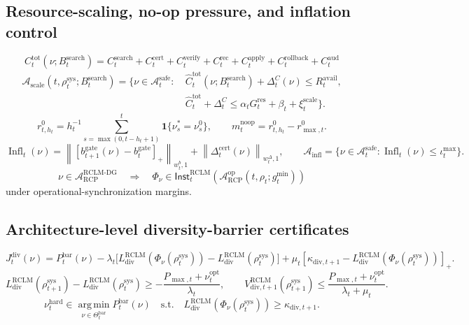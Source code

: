 \documentclass[11pt,a4paper]{article}
\newcommand{\Acal}{\mathcal A}
\newcommand{\argmin}{\operatorname*{arg\,min}}
\newcommand{\RCP}{\mathrm{RCP}}
\newcommand{\RCLM}{\mathrm{RCLM}}
\newcommand{\DG}{\mathrm{DG}}
\newcommand{\sys}{\mathrm{sys}}
\newcommand{\rec}{\mathrm{rec}}
\newcommand{\safe}{\mathrm{safe}}
\newcommand{\aud}{\mathrm{aud}}
\newcommand{\verify}{\mathrm{verify}}
\newcommand{\search}{\mathrm{search}}
\newcommand{\cert}{\mathrm{cert}}
\newcommand{\apply}{\mathrm{apply}}
\newcommand{\hard}{\mathrm{hard}}
\newcommand{\scale}{\mathrm{scale}}
\newcommand{\noop}{\mathrm{noop}}
\newcommand{\infl}{\mathrm{infl}}
\newcommand{\gate}{\mathrm{gate}}
\newcommand{\tot}{\mathrm{tot}}
\newcommand{\avail}{\mathrm{avail}}
\newcommand{\res}{\mathrm{res}}
\newcommand{\rollback}{\mathrm{rollback}}
\begin{document}
\subsection*{Resource-scaling, no-op pressure, and inflation control}
\[
C_t^{\tot}(\nu;B_t^{\search})
=C_t^{\search}+C_t^{\cert}+C_t^{\verify}+C_t^{\rec}+C_t^{\apply}+C_t^{\rollback}+C_t^{\aud}
\]
\[
\begin{aligned}
\Acal_{\scale}(t,\rho_t^{\sys};B_t^{\search})
=\{\nu\in\Acal_t^{\safe}:&
\ \widehat C_t^{\tot}(\nu;B_t^{\search})+\Delta_t^C(\nu)\le R_t^{\avail},\\
&
\ \widehat C_t^{\tot}+\Delta_t^C
\le\alpha_tG_t^{\res}+\beta_t+\xi_t^{\scale}\}.
\end{aligned}
\]
\[
r_{t,h_t}^{0}=h_t^{-1}\sum_{s=\max(0,t-h_t+1)}^t\mathbf 1\{\nu_s^*=\nu_s^0\},
\qquad
m_t^{\noop}=r_{t,h_t}^{0}-r_{\max,t}^{0}.
\]
\[
\operatorname{Infl}_t(\nu)=
\left\|[b_{t+1}^{\gate}(\nu)-b_t^{\gate}]_+\right\|_{w_t^b,1}
+
\left\|\Delta_t^{\cert}(\nu)\right\|_{w_t^\Delta,1},
\qquad
\Acal_{\infl}=\{\nu\in\Acal_t^{\safe}:\operatorname{Infl}_t(\nu)\le\iota_t^{\max}\}.
\]
\[
\nu\in\Acal_{\RCP}^{\RCLM\text{-}\DG}
\quad\Longrightarrow\quad
\Phi_\nu\in\mathsf{Inst}_t^{\RCLM}\!\left(\Acal_{\RCP}^{\mathrm{op}}(t,\rho_t;g_t^{\min})\right)
\]
under operational-synchronization margins.

\subsection*{Architecture-level diversity-barrier certificates}
\[
J_t^{\mathrm{div}}(\nu)
=
P_t^{\mathrm{bar}}(\nu)
-\lambda_t\bigl[L_{\mathrm{div}}^{\RCLM}(\Phi_\nu(\rho_t^{\sys}))-L_{\mathrm{div}}^{\RCLM}(\rho_t^{\sys})\bigr]
+\mu_t[\kappa_{\mathrm{div},t+1}-L_{\mathrm{div}}^{\RCLM}(\Phi_\nu(\rho_t^{\sys}))]_+.
\]
\[
L_{\mathrm{div}}^{\RCLM}(\rho_{t+1}^{\sys})-L_{\mathrm{div}}^{\RCLM}(\rho_t^{\sys})
\ge
-\frac{P_{\max,t}+\nu_t^{\mathrm{opt}}}{\lambda_t},
\qquad
V_{\mathrm{div},t+1}^{\RCLM}(\rho_{t+1}^{\sys})
\le
\frac{P_{\max,t}+\nu_t^{\mathrm{opt}}}{\lambda_t+\mu_t}.
\]
\[
\nu_t^{\hard}
\in
\argmin_{\nu\in\Theta_t^{\mathrm{bar}}}P_t^{\mathrm{bar}}(\nu)
\quad\mathrm{s.t.}\quad
L_{\mathrm{div}}^{\RCLM}(\Phi_\nu(\rho_t^{\sys}))\ge\kappa_{\mathrm{div},t+1}.
\]
\end{document}
